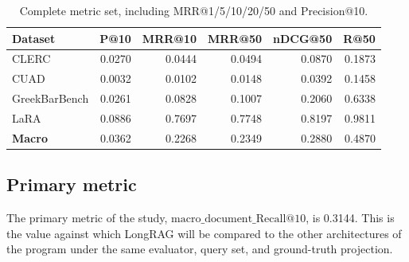 \documentclass[11pt,a4paper]{article}
\begin{document}
\begin{table}[h]
\centering
\caption{Complete metric set, including MRR@1/5/10/20/50 and
Precision@10.}
\label{tab:results-full}
\small
\begin{tabular}{l r r r r r}
\toprule
\textbf{Dataset} & \textbf{P@10} & \textbf{MRR@10} & \textbf{MRR@50}
  & \textbf{nDCG@50} & \textbf{R@50} \\
\midrule
CLERC              & \num{0.0270} & \num{0.0444} & \num{0.0494}
  & \num{0.0870} & \num{0.1873} \\
CUAD               & \num{0.0032} & \num{0.0102} & \num{0.0148}
  & \num{0.0392} & \num{0.1458} \\
GreekBarBench      & \num{0.0261} & \num{0.0828} & \num{0.1007}
  & \num{0.2060} & \num{0.6338} \\
LaRA               & \num{0.0886} & \num{0.7697} & \num{0.7748}
  & \num{0.8197} & \num{0.9811} \\
\midrule
\textbf{Macro}     & \num{0.0362} & \num{0.2268} & \num{0.2349}
  & \num{0.2880} & \num{0.4870} \\
\bottomrule
\end{tabular}
\end{table}

\subsection{Primary metric}
The primary metric of the study,
$\mathrm{macro\_document\_Recall@10}$, is \num{0.3144}. This is the
value against which LongRAG will be compared to the other
architectures of the program under the same evaluator, query set,
and ground-truth projection.
\end{document}
